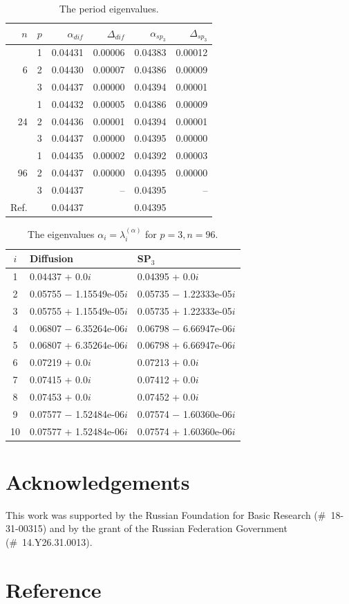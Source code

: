 \documentclass[authoryear]{elsarticle}
\begin{document}
\begin{table}[h]
\caption{The period eigenvalues.}
\label{tab:hwr_alpha_del}
\begin{center}
\begin{tabular}{rrrrrr}
\hline
$n$ & $p$ & $\alpha_{dif}$ & $\Delta_{dif}$ &$\alpha_{sp_3}$& $\Delta_{sp_3}$ \\
\hline
	& 1	&0.04431 & 0.00006 & 0.04383 & 0.00012\\
6	& 2	&0.04430 & 0.00007 & 0.04386 & 0.00009\\
	& 3	&0.04437 & 0.00000 & 0.04394 & 0.00001\\ 
\hline
	& 1	&0.04432 & 0.00005 & 0.04386 & 0.00009\\
24& 2	&0.04436 & 0.00001 & 0.04394 & 0.00001\\
	& 3	&0.04437 & 0.00000 & 0.04395 & 0.00000\\ 
\hline
	& 1	&0.04435 & 0.00002 & 0.04392 & 0.00003\\
96& 2	&0.04437 & 0.00000 & 0.04395 & 0.00000\\
	& 3	&0.04437 & --      & 0.04395 & -- \\ 
\hline
Ref.& & 0.04437 & & 0.04395 \\ 
\hline
\end{tabular}
\end{center}
\end{table}

\begin{table}[h]
\caption{The eigenvalues $\alpha_i=\lambda_i^{(\alpha)}$ for $p=3, n=96$.}
\label{tab:hwr_alpha_del_10}
\begin{center}
\begin{tabular}{c l l}
\hline
$i$ & Diffusion & SP$_3$ \\
\hline
1 &0.04437 + 0.0$i$     		&0.04395 + 0.0$i$ \\
2 &0.05755 $-$ 1.15549e-05$i$ 	&0.05735 $-$ 1.22333e-05$i$ \\
3 &0.05755 + 1.15549e-05$i$   	&0.05735 + 1.22333e-05$i$ \\
4 &0.06807 $-$ 6.35264e-06$i$   &0.06798 $-$ 6.66947e-06$i$ \\
5 &0.06807 + 6.35264e-06$i$     &0.06798 + 6.66947e-06$i$ \\
6 &0.07219 + 0.0$i$             &0.07213 + 0.0$i$ \\
7 &0.07415 + 0.0$i$             &0.07412 + 0.0$i$ \\
8 &0.07453 + 0.0$i$          	&0.07452 + 0.0$i$ \\
9 &0.07577 $-$ 1.52484e-06$i$   &0.07574 $-$ 1.60360e-06$i$ \\
10&0.07577 + 1.52484e-06$i$     &0.07574 + 1.60360e-06$i$ \\
\hline
\end{tabular}
\end{center}
\end{table}

\pagebreak
\newpage
\section*{Acknowledgements}

This work was supported by the Russian Foundation for Basic Research (\#~18-31-00315) 
and by the grant of the Russian Federation Government (\#~14.Y26.31.0013).

\section*{Reference}

\end{document}
